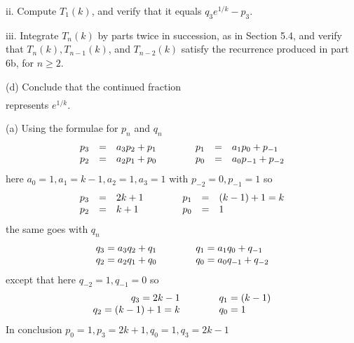 \documentclass[aps,preprint,preprintnumbers,nofootinbib,showpacs,prd]{revtex4-1}
\newcommand{\nbea}{\begin{eqnarray*}}
\newcommand{\neea}{\end{eqnarray*}}
\begin{document}
ii. Compute $T_1 (k)$, and verify that it equals $q_3 e^{1/k} - p_3$.

iii. Integrate $T_n (k)$ by parts twice in succession, as in Section 5.4, and verify that $T_n (k), T_{n-1} (k)$, and $T_{n-2} (k)$ satisfy the recurrence produced in part 6b, for $n \ge 2$.

(d) Conclude that the continued fraction
%
\nbea
[1, (k - 1), 1, 1, (3k - 1), 1, 1, (5k - 1), 1, 1, (7k - 1), \dots]
\neea
%
represents $e^{1/k}$.

(a) Using the formulae for $p_n$ and $q_n$
%
\nbea
\begin{array}{r c l c r c l}
p_3 & = & a_3p_2 + p_1 & ~~~~~~ & p_1 & = & a_1p_0 + p_{-1}\\
p_2 & = & a_2p_1 + p_0 & ~~~~~~ & p_0 & = & a_0p_{-1} + p_{-2}
\end{array}
\neea
%
here $a_0 = 1, a_1 = k - 1, a_2 = 1, a_3 = 1$ with $p_{-2} = 0, p_{-1} = 1$ so
%
\nbea
\begin{array}{r c l c r c l}
p_3 & = & 2k + 1 & ~~~~~~ & p_1 & = & (k-1) + 1 = k \\
p_2 & = & k + 1 & ~~~~~~ & p_0 & = & 1
\end{array}
\neea
%
the same goes with $q_n$
%
\nbea
\begin{array}{r c l c r c l}
q_3 = a_3q_2 + q_1 & ~~~~~~ & q_1 = a_1q_0 + q_{-1} \\
q_2 = a_2q_1 + q_0 & ~~~~~~ & q_0 = a_0q_{-1} + q_{-2}
\end{array}
\neea
%
except that here $q_{-2} = 1, q_{-1} = 0$ so
%
\nbea
\begin{array}{r c l c r c l}
q_3 = 2k - 1 & ~~~~~~ & q_1 = (k-1) \\
q_2 = (k-1) + 1 = k & ~~~~~~ & q_0 = 1
\end{array}
\neea
%
In conclusion $p_0 = 1, p_3 = 2k + 1, q_0 = 1, q_3 = 2k - 1$
\end{document}
